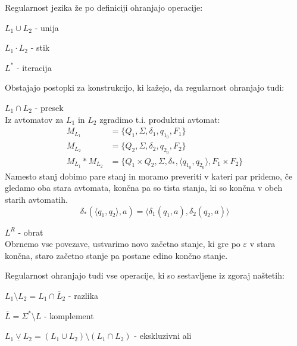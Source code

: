\documentclass[10pt,a4paper,oneside]{book}
\begin{document}
Regularnost jezika že po definiciji ohranjajo operacije:
\begin{items}
\item $L_1 \cup L_2$ - unija 
\item $L_1 \cdot L_2$ - stik 
\item $L^*$ - iteracija
\end{items}
Obstajajo postopki za konstrukcijo, ki kažejo, da regularnost ohranjajo tudi:
\begin{items}
\item $L_1 \cap L_2$ - presek\\
	Iz avtomatov za $L_1$ in $L_2$ zgradimo t.i. produktni avtomat:
		\begin{align*}
			M_{L_1} &= \{ Q_1, \Sigma, \delta_1, q_{1_0}, F_1 \}\\
			M_{L_2} &= \{ Q_2, \Sigma, \delta_2, q_{2_0}, F_2 \}\\
			M_{L_1}*M_{L_2} &= \{ Q_1 \times Q_2, \Sigma, \delta_*, \langle q_{1_0}, q_{2_0} \rangle, F_1 \times F_2 \}
		\end{align*}
	Namesto stanj dobimo pare stanj in moramo preveriti v kateri par pridemo, če gledamo oba stara avtomata, končna pa so tista stanja, ki so končna v obeh starih avtomatih.
	\[ \delta_*(\langle q_1, q_2 \rangle, a) = \langle \delta_1(q_1, a), \delta_2(q_2, a)\rangle \]
\item $L^R$ - obrat\\
	Obrnemo vse povezave, ustvarimo novo začetno stanje, ki gre po $\varepsilon$ v stara končna, staro začetno stanje pa postane edino končno stanje.
\end{items}
Regularnost ohranjajo tudi vse operacije, ki so sestavljene iz zgoraj naštetih:
\begin{items}
\item $L_1 \setminus L_2 = L_1 \cap \overline L_2$ - razlika
\item $\overline{L} = \Sigma^* \setminus L$ - komplement
\item $L_1 \underline\vee L_2 = (L_1 \cup L_2) \setminus (L_1 \cap L_2)$ - ekskluzivni ali 
\end{items}
\end{document}
